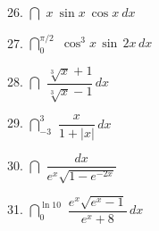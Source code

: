 \documentclass{sebase}
\begin{document}
\begin{multicols}{2}
\begin{ExerciseList}
\item[\hfill 26.] $\dint \,\,x~\sin x~\cos x~dx$

%

\item[\hfill 27.] $\dint\nolimits_{0}^{\pi /2}\,\,\cos ^{3}x\,\sin \,2x\,dx$

%

%

\item[\hfill 28.] $\dint \,\,\dfrac{\sqrt[3]{x}+1}{\sqrt[3]{x}-1}\,dx$

%

\item[\hfill 29.] $\dint\nolimits_{-3}^{3}\,\,\dfrac{x}{1+\left\vert
x\right\vert }\,dx$

%

\item[\hfill 30.] $\dint \,\,\dfrac{dx}{e^{x}\sqrt{1-e^{-2x}}}$

%

\item[\hfill 31.] $\dint\nolimits_{0}^{\ln 10}\,\,\dfrac{e^{x}\sqrt{e^{x}-1}%
}{e^{x}+8}\,dx$

%

%


\end{ExerciseList}
\end{multicols}
\end{document}

